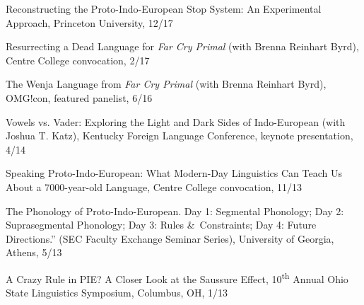 \documentclass[paper=letter,fontsize=11pt]{scrartcl} %
\newcommand{\TalkEntry}[4]{
		\noindent #1, #2, #3 #4}
\begin{document}
\begin{etaremune}
\item\TalkEntry{Reconstructing the Proto-Indo-European Stop System: An Experimental Approach}{Princeton University}{12/17}
\item\TalkEntry{Resurrecting a Dead Language for \textit{Far Cry Primal} (with Brenna Reinhart Byrd)}{Centre College convocation}{2/17}
\item\TalkEntry{The Wenja Language from \textit{Far Cry Primal} (with Brenna Reinhart Byrd)}{OMG!con, featured panelist}{6/16}
\item\TalkEntry{Vowels vs. Vader: Exploring the Light and Dark Sides of Indo-European (with Joshua T. Katz)}{Kentucky Foreign Language Conference, keynote presentation}{4/14}
\item\TalkEntry{Speaking Proto-Indo-European: What Modern-Day Linguistics Can Teach Us About a 7000-year-old Language}{Centre College convocation}{11/13}
\item\TalkEntry{The Phonology of Proto-Indo-European. Day 1: Segmental Phonology; Day 2: Suprasegmental Phonology; Day 3: Rules \&~Constraints; Day 4: Future Directions.” (SEC Faculty Exchange Seminar Series)}{University of Georgia, Athens}{5/13}
\item\TalkEntry{A Crazy Rule in PIE? A Closer Look at the Saussure Effect}{10\textsuperscript{th} Annual Ohio State Linguistics Symposium, Columbus, OH}{1/13}
\end{etaremune}
\end{document}

